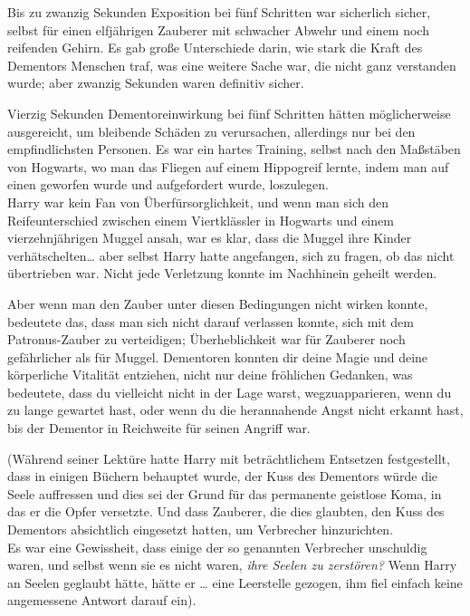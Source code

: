 {Bis zu zwanzig Sekunden Exposition bei fünf Schritten war sicherlich sicher, selbst für einen elfjährigen Zauberer mit schwacher Abwehr und einem noch reifenden Gehirn. Es gab große Unterschiede darin, wie stark die Kraft des Dementors Menschen traf, was eine weitere Sache war, die nicht ganz verstanden wurde; aber zwanzig Sekunden waren definitiv sicher.

Vierzig Sekunden Dementoreinwirkung bei fünf Schritten hätten möglicherweise ausgereicht, um bleibende Schäden zu verursachen, allerdings nur bei den empfindlichsten Personen. Es war ein hartes Training, selbst nach den Maßstäben von Hogwarts, wo man das Fliegen auf einem Hippogreif lernte, indem man auf einen geworfen wurde und aufgefordert wurde, loszulegen.\\ Harry war kein Fan von Überfürsorglichkeit, und wenn man sich den Reifeunterschied zwischen einem Viertklässler in Hogwarts und einem vierzehnjährigen Muggel ansah, war es klar, dass die Muggel ihre Kinder verhätschelten… aber selbst Harry hatte angefangen, sich zu fragen, ob das nicht übertrieben war. Nicht jede Verletzung konnte im Nachhinein geheilt werden.

Aber wenn man den Zauber unter diesen Bedingungen nicht wirken konnte, bedeutete das, dass man sich nicht darauf verlassen konnte, sich mit dem Patronus-Zauber zu verteidigen; Überheblichkeit war für Zauberer noch gefährlicher als für Muggel. Dementoren konnten dir deine Magie und deine körperliche Vitalität entziehen, nicht nur deine fröhlichen Gedanken, was bedeutete, dass du vielleicht nicht in der Lage warst, wegzuapparieren, wenn du zu lange gewartet hast, oder wenn du die herannahende Angst nicht erkannt hast, bis der Dementor in Reichweite für seinen Angriff war.

(Während seiner Lektüre hatte Harry mit beträchtlichem Entsetzen festgestellt, dass in einigen Büchern behauptet wurde, der Kuss des Dementors würde die Seele auffressen und dies sei der Grund für das permanente geistlose Koma, in das er die Opfer versetzte. Und dass Zauberer, die dies glaubten, den Kuss des Dementors absichtlich eingesetzt hatten, um Verbrecher hinzurichten.\\ Es war eine Gewissheit, dass einige der so genannten Verbrecher unschuldig waren, und selbst wenn sie es nicht waren, \emph{ihre Seelen zu zerstören?} Wenn Harry an Seelen geglaubt hätte, hätte er … eine Leerstelle gezogen, ihm fiel einfach keine angemessene Antwort darauf ein).

}
